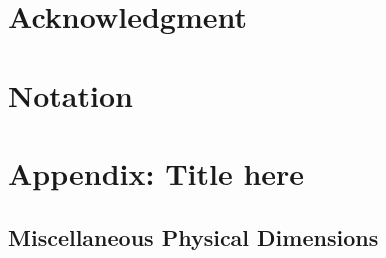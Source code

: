 \documentclass[letterpaper, preprint, paper,11pt]{AAS}	%
\begin{document}
\section{Acknowledgment}






\section{Notation}







\appendix
\section*{Appendix: Title here}


\subsection*{Miscellaneous Physical Dimensions}
\end{document}
